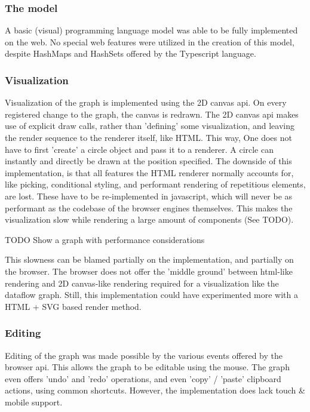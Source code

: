 \subsubsection*{The model}
A basic (visual) programming language model was able to be fully implemented on the web. 
No special web features were utilized in the creation of this model, despite HashMaps and HashSets offered by the Typescript language. 

\subsubsection*{Visualization}
Visualization of the graph is implemented using the 2D canvas api.  
On every registered change to the graph, the canvas is redrawn. 
The 2D canvas api makes use of explicit draw calls, rather than 'defining' some visualization, and leaving the render sequence to the renderer itself, like HTML.
This way, One does not have to first 'create' a circle object and pass it to a renderer. 
A circle can instantly and directly be drawn at the position specified.
The downside of this implementation, is that all features the HTML renderer normally accounts for, like picking, conditional styling, and performant rendering of repetitious elements, are lost.
These have to be re-implemented in javascript, which will never be as performant as the codebase of the browser engines themselves. 
This makes the visualization slow while rendering a large amount of components (See TODO). 

\begin{note}
  TODO Show a graph with performance considerations
\end{note}

This slowness can be blamed partially on the implementation, and partially on the browser. 
The browser does not offer the 'middle ground' between html-like rendering and 2D canvas-like rendering required for a visualization like the dataflow graph. 
Still, this implementation could have experimented more with a HTML + SVG based render method.

\subsubsection*{Editing}
Editing of the graph was made possible by the various events offered by the browser api. 
This allows the graph to be editable using the mouse. 
The graph even offers 'undo' and 'redo' operations, and even 'copy' / 'paste' clipboard actions, using common shortcuts. 
However, the implementation does lack touch \& mobile support.

